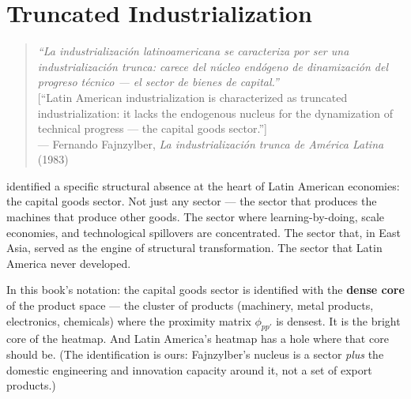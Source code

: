 \documentclass[../structural_economics_book.tex]{subfiles}
\begin{document}
\ifSubfilesClassLoaded{\setcounter{chapter}{24}}{}
\chapter{Truncated Industrialization}\label{ch:25}
\begin{quote}
\textit{``La industrializaci\'{o}n latinoamericana se caracteriza por ser una industrializaci\'{o}n trunca: carece del n\'{u}cleo end\'{o}geno de dinamizaci\'{o}n del progreso t\'{e}cnico --- el sector de bienes de capital.''}\\[0.3em]
\textnormal{[``Latin American industrialization is characterized as truncated industrialization: it lacks the endogenous nucleus for the dynamization of technical progress --- the capital goods sector.'']}\\
\hfill --- Fernando Fajnzylber, \textit{La industrializaci\'{o}n trunca de Am\'{e}rica Latina} (1983)
\end{quote}
\nocite{fajnzylber1983industrializacion}

\vspace{1em}

\citet{fajnzylber1983industrializacion} identified a specific structural absence at the heart of Latin American economies: the capital goods sector. Not just any sector --- the sector that produces the machines that produce other goods. The sector where learning-by-doing, scale economies, and technological spillovers are concentrated. The sector that, in East Asia, served as the engine of structural transformation. The sector that Latin America never developed.

In this book's notation: the capital goods sector is identified with the \textbf{dense core} of the product space --- the cluster of products (machinery, metal products, electronics, chemicals) where the proximity matrix $\phi_{pp'}$ is densest. It is the bright core of the heatmap. And Latin America's heatmap has a hole where that core should be. (The identification is ours: Fajnzylber's nucleus is a sector \emph{plus} the domestic engineering and innovation capacity around it, not a set of export products.)
\end{document}
